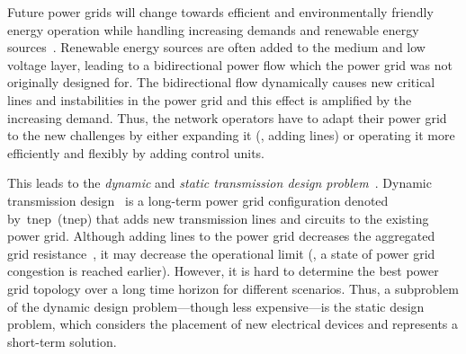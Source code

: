 \label{ch:switching}
\glsresetall
%
Future power grids will change towards efficient and environmentally friendly
energy operation while handling increasing demands and renewable energy
sources~\parencite{969970}. Renewable energy sources are often added to the
medium and low voltage layer, leading to a bidirectional power flow which the
power grid was not originally designed for. The bidirectional flow dynamically
causes new critical lines and instabilities in the power grid and this effect is
amplified by the increasing demand.
% 
Thus, the network operators have to adapt their power grid to the new challenges
by either expanding it (\ie, adding lines) or operating it more efficiently and
flexibly by adding control units.

This leads to the \emph{dynamic} and \emph{static transmission design
problem}~\parencite{Bin01a}. Dynamic transmission
design~\parencite{Gal92,Cho06,Bin01a} is a long-term power grid configuration
denoted by~\acrlong{tnep}~(\gls{tnep}) that adds new transmission lines and
circuits to the existing power grid. Although adding lines to the power grid
decreases the aggregated grid resistance~\parencite{Pot12,Cof14a}, it may
decrease the operational limit (\ie, a state of power grid congestion is reached
earlier).
%
However, it is hard to determine the best power grid topology over a long
time horizon for different scenarios. Thus, a subproblem of the dynamic design
%
problem---though less expensive---is the static design problem, which
considers the placement of new electrical devices and represents a short-term
solution.

